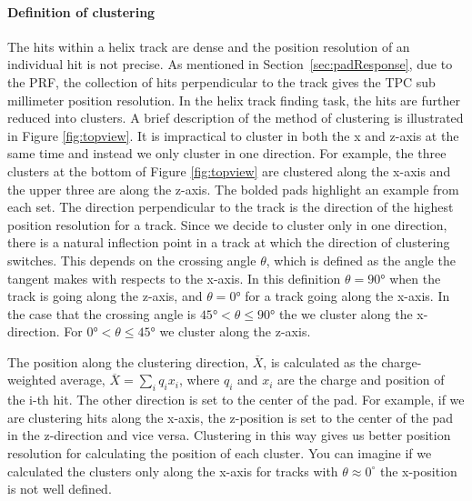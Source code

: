 \paragraph{Definition of clustering}
The hits within a helix track are dense and the position resolution of an individual hit is not precise. As mentioned in Section~\ref{sec:padResponse}, due to the PRF, the collection of hits perpendicular to the track gives the TPC sub millimeter position resolution. In the helix track finding task, the hits are further reduced into clusters. A brief description of the method of clustering is illustrated in Figure \ref{fig:topview}. It is impractical to cluster in both the x and z-axis at the same time and instead we only cluster in one direction. For example, the three clusters at the bottom of Figure \ref{fig:topview} are clustered along the x-axis and the upper three are along the z-axis. The bolded pads highlight an example from each set. The direction perpendicular to the track is the direction of the highest position resolution for a track. Since we decide to cluster only in one direction, there is a natural inflection point in a track at which the direction of clustering switches. This  depends on the crossing angle $\theta$, which is defined as the angle the tangent makes with respects to the x-axis. In this definition $\theta = \ang{90}$ when the track is going along the z-axis, and $\theta = \ang{0}$ for a track going along the x-axis. In the case that the crossing angle is $\ang{45} < \theta \leq \ang{90} $ the we cluster along the x-direction. For $\ang{0} < \theta \leq \ang{45}$ we cluster along the z-axis. 


 
 The position along the clustering direction, $\overline{X}$, is calculated as the charge-weighted average, $\overline{X} = \sum_i q_ix_i$, where $q_i$ and $x_i$ are the charge and position of the i-th hit. The other direction is set to the center of the pad. For example, if we are clustering hits along the x-axis, the z-position is set to the center of the pad in the z-direction and vice versa. Clustering in this way gives us better position resolution for calculating the position of each cluster. You can imagine if we calculated the clusters only along the x-axis for tracks with $\theta \approx 0^{\circ}$ the x-position is not well defined. 

